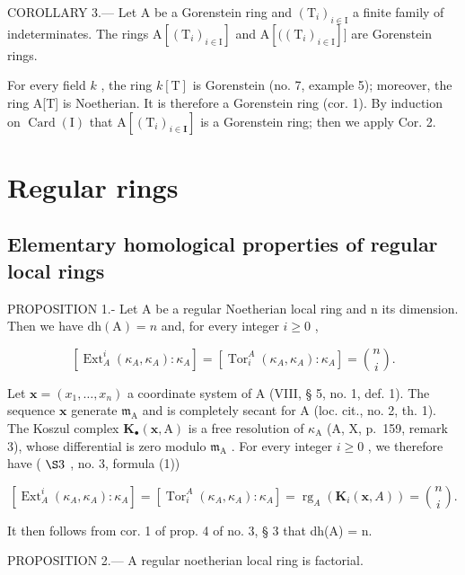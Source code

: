 COROLLARY 3.--- Let A be a Gorenstein ring and \((\mathrm{T}_{i})_{i\in\mathrm{I}}\) a finite family of indeterminates. The rings \(\mathrm{A}[(\mathrm{T}_{i})_{i\in\mathrm{I}}]\) and \(\mathrm{A}[((\mathrm{T}_{i})_{i\in\mathrm{I}}]]\) are Gorenstein rings.

For every field \(k\) , the ring \(k[\mathrm{T}]\) is Gorenstein (no. 7, example 5); moreover, the ring A{[}T{]} is Noetherian. It is therefore a Gorenstein ring (cor. 1). By induction on \(\operatorname{Card}(\mathrm{I})\) that \(\mathrm{A}[(\mathrm{T}_i)_{i\in \mathbf{I}}]\) is a Gorenstein ring; then we apply Cor. 2.

\section{Regular rings}

\subsection{Elementary homological properties of regular local rings}

PROPOSITION 1.- Let A be a regular Noetherian local ring and n its dimension. Then we have \(\mathrm{dh(A)} = n\) and, for every integer \(i \geqslant 0\) ,

\[
\left[ \operatorname{Ext} _ {A} ^ {i} \left(\kappa_ {A}, \kappa_ {A}\right): \kappa_ {A} \right] = \left[ \operatorname{Tor} _ {i} ^ {A} \left(\kappa_ {A}, \kappa_ {A}\right): \kappa_ {A} \right] = \binom {n} {i}.
\]

Let \(\mathbf{x} = (x_{1},\ldots ,x_{n})\) a coordinate system of A (VIII, § 5, no. 1, def. 1). The sequence \(\mathbf{x}\) generate \(\mathfrak{m}_{\mathrm{A}}\) and is completely secant for A (loc. cit., no. 2, th. 1). The Koszul complex \(\mathbf{K}_{\bullet}(\mathbf{x},\mathrm{A})\) is a free resolution of \(\kappa_{\mathrm{A}}\) (A, X, p.~159, remark 3), whose differential is zero modulo \(\mathfrak{m}_{\mathrm{A}}\) . For every integer \(i\geqslant 0\) , we therefore have ( \(\S 3\) , no. 3, formula (1))

\[
\left[ \operatorname{Ext} _ {A} ^ {i} (\kappa_ {A}, \kappa_ {A}): \kappa_ {A} \right] = \left[ \operatorname{Tor} _ {i} ^ {A} (\kappa_ {A}, \kappa_ {A}): \kappa_ {A} \right] = \operatorname{rg} _ {A} (\mathbf {K} _ {i} (\mathbf {x}, A)) = \binom {n} {i}.
\]

It then follows from cor. 1 of prop. 4 of no. 3, § 3 that dh(A) = n.

PROPOSITION 2.--- A regular noetherian local ring is factorial.


